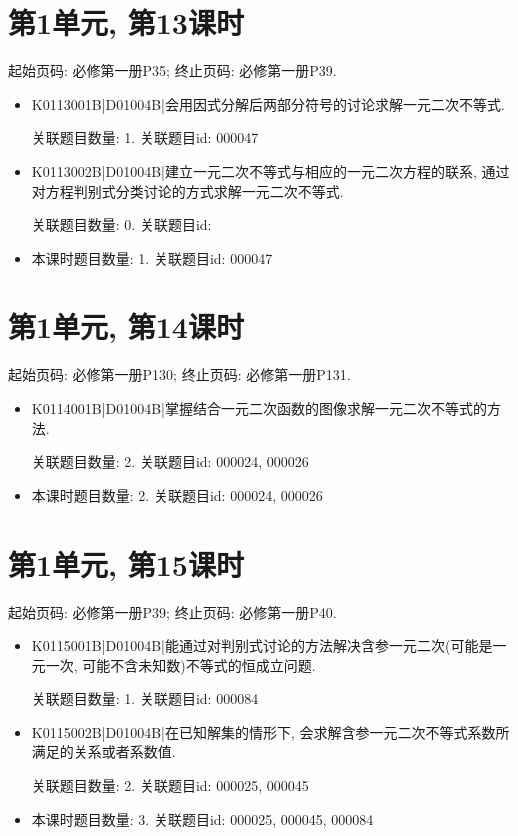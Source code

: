 \section*{第1单元, 第13课时}
起始页码: 必修第一册P35; 终止页码: 必修第一册P39.
\begin{itemize}
\item K0113001B|D01004B|会用因式分解后两部分符号的讨论求解一元二次不等式.

关联题目数量: 1. 关联题目id: 000047

\item K0113002B|D01004B|建立一元二次不等式与相应的一元二次方程的联系, 通过对方程判别式分类讨论的方式求解一元二次不等式.

关联题目数量: 0. 关联题目id: 

\item 本课时题目数量: 1. 关联题目id: 000047

\end{itemize}

\section*{第1单元, 第14课时}
起始页码: 必修第一册P130; 终止页码: 必修第一册P131.
\begin{itemize}
\item K0114001B|D01004B|掌握结合一元二次函数的图像求解一元二次不等式的方法.

关联题目数量: 2. 关联题目id: 000024, 000026

\item 本课时题目数量: 2. 关联题目id: 000024, 000026

\end{itemize}

\section*{第1单元, 第15课时}
起始页码: 必修第一册P39; 终止页码: 必修第一册P40.
\begin{itemize}
\item K0115001B|D01004B|能通过对判别式讨论的方法解决含参一元二次(可能是一元一次, 可能不含未知数)不等式的恒成立问题.

关联题目数量: 1. 关联题目id: 000084

\item K0115002B|D01004B|在已知解集的情形下, 会求解含参一元二次不等式系数所满足的关系或者系数值.

关联题目数量: 2. 关联题目id: 000025, 000045

\item 本课时题目数量: 3. 关联题目id: 000025, 000045, 000084

\end{itemize}

